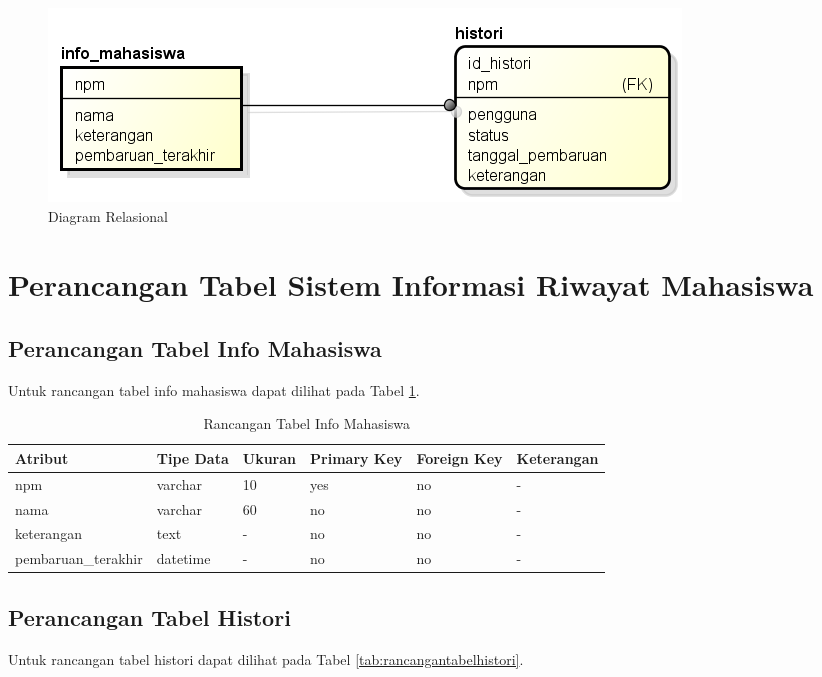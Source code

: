 \begin{figure}[ht]
\centering
\includegraphics[scale=1]{Gambar/diagramrelasional.png}
\caption[Diagram Relasional]{Diagram Relasional} 
\label{fig:diagramrelasional}
\end{figure}

\section{Perancangan Tabel Sistem Informasi Riwayat Mahasiswa}
\label{sec:perancangantabel}

\subsection{Perancangan Tabel Info Mahasiswa}
Untuk rancangan tabel info mahasiswa dapat dilihat pada Tabel
\ref{tab:rancangantabelinfomahasiswa}.

\begin{table}[ht]
\caption[Tabel Rancangan Tabel Info Mahasiswa]{Rancangan Tabel Info Mahasiswa}
\label{tab:rancangantabelinfomahasiswa}
\centering
\begin{tabular}{|l|l|p{1.2cm}|p{1.2cm}|p{1.2cm}|l|}
\hline
Atribut & Tipe Data & Ukuran & Primary Key & Foreign Key & Keterangan\\
\hline
npm & varchar & 10 & yes & no & -\\
\hline
nama & varchar & 60 & no & no & -\\
\hline
keterangan & text & - & no & no & -\\
\hline
pembaruan\_terakhir & datetime & - & no & no & -\\
\hline
\end{tabular}
\end{table}

\subsection{Perancangan Tabel Histori}
Untuk rancangan tabel histori dapat dilihat pada Tabel
\ref{tab:rancangantabelhistori}.


